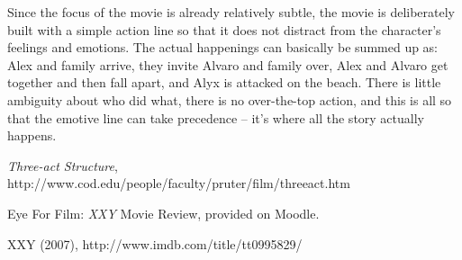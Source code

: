 \documentclass{article}
\begin{document}
Since the focus of the movie is already relatively subtle, the movie is deliberately built with a simple action line so that it does not distract from the character's feelings and emotions.
The actual happenings can basically be summed up as: Alex and family arrive, they invite Alvaro and family over, Alex and Alvaro get together and then fall apart, and Alyx is attacked on the beach.
There is little ambiguity about who did what, there is no over-the-top action, and this is all so that the emotive line can take precedence -- it's where all the story actually happens.

\begin{thebibliography}{9}

	\emph{Three-act Structure}, http://www.cod.edu/people/faculty/pruter/film/threeact.htm

	Eye For Film: \emph{XXY} Movie Review, provided on Moodle.

	XXY (2007), http://www.imdb.com/title/tt0995829/

\end{thebibliography}
\end{document}
